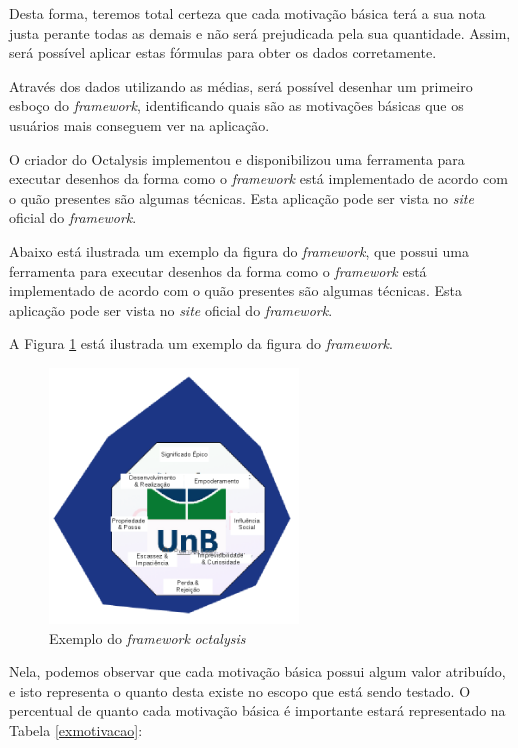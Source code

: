 Desta forma, teremos total certeza que cada motivação básica terá a sua nota justa perante todas as demais e não será prejudicada
pela sua quantidade. Assim, será possível aplicar estas fórmulas para obter os dados corretamente.

Através dos dados utilizando as médias, será possível desenhar um primeiro esboço do \textit{framework}, identificando quais são as motivações
básicas que os usuários mais conseguem ver na aplicação. 

O criador do Octalysis implementou e disponibilizou uma ferramenta para executar desenhos da forma como o \textit{framework} está implementado
de acordo com o quão presentes são algumas técnicas. Esta aplicação pode ser vista no \textit{site} oficial do \textit{framework}.

Abaixo está ilustrada um exemplo da figura do \textit{framework},  que possui uma ferramenta para executar desenhos da forma como o \textit{framework} está implementado
de acordo com o quão presentes são algumas técnicas. Esta aplicação pode ser vista no \textit{site} oficial do \textit{framework}.

A Figura \ref{fig:exoctalysis} está ilustrada um exemplo da figura do \textit{framework}.

 \begin{figure}[h]
     \centering

     \includegraphics[width=250px, scale=1]{figuras/exoctalysis}
     \caption{Exemplo do \textit{framework} \textit{octalysis}}

     \label{fig:exoctalysis}
 \end{figure}


Nela, podemos observar que cada motivação básica possui algum valor atribuído, e isto representa o quanto desta existe no escopo que
está sendo testado. O percentual de quanto cada motivação básica é importante estará representado na Tabela \ref{exmotivacao}:

